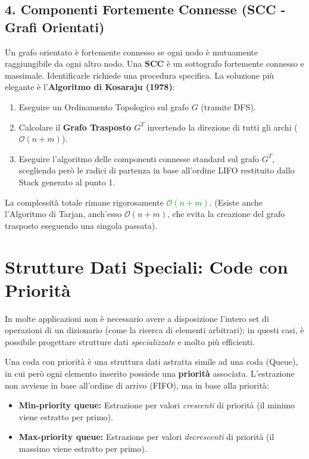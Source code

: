 \documentclass[12pt, a4paper]{article}
\begin{document}
\subsection{4. Componenti Fortemente Connesse (SCC - Grafi Orientati)}
Un grafo orientato è fortemente connesso se ogni nodo è mutuamente raggiungibile da ogni altro nodo. Una \textbf{SCC} è un sottografo fortemente connesso e massimale.
Identificarle richiede una procedura specifica. La soluzione più elegante è l'\textbf{Algoritmo di Kosaraju (1978)}:
\begin{enumerate}
\item Eseguire un Ordinamento Topologico sul grafo $G$ (tramite DFS).
\item Calcolare il \textbf{Grafo Trasposto $G^T$} invertendo la direzione di tutti gli archi ($\mathcal{O}(n+m)$).
\item Eseguire l'algoritmo delle componenti connesse standard sul grafo $G^T$, scegliendo però le radici di partenza in base all'ordine LIFO restituito dallo Stack generato al punto 1.
\end{enumerate}
La complessità totale rimane rigorosamente \textcolor{green}{$\mathcal{O}(n + m)$}. (Esiste anche l'Algoritmo di Tarjan, anch'esso $\mathcal{O}(n+m)$, che evita la creazione del grafo trasposto eseguendo una singola passata).



\section{Strutture Dati Speciali: Code con Priorità}

In molte applicazioni non è necessario avere a disposizione l'intero set di operazioni di un dizionario (come la ricerca di elementi arbitrari); in questi casi, è possibile progettare strutture dati \textit{specializzate} e molto più efficienti.

\begin{tcolorbox}[colback=lightergray!10, colframe=tocsec, title=\textbf{Definizione: Coda con Priorità (Priority Queue)}]
Una coda con priorità è una struttura dati astratta simile ad una coda (Queue), in cui però ogni elemento inserito possiede una \textbf{priorità} associata.
L'estrazione non avviene in base all'ordine di arrivo (FIFO), ma in base alla priorità:
\begin{itemize}
\item \textbf{Min-priority queue:} Estrazione per valori \textit{crescenti} di priorità (il minimo viene estratto per primo).
\item \textbf{Max-priority queue:} Estrazione per valori \textit{decrescenti} di priorità (il massimo viene estratto per primo).
\end{itemize}
\end{tcolorbox}
\end{document}
